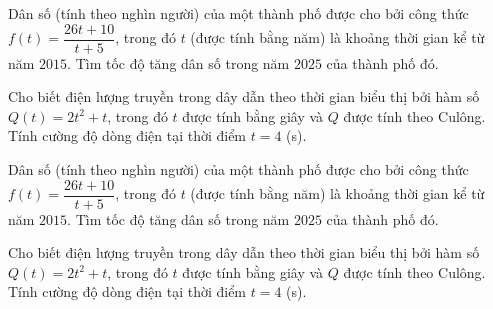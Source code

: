 \begin{bt}%
	Dân số (tính theo nghìn người) của một thành phố được cho bởi công thức $f(t)=\dfrac{26t+10}{t+5}$, trong đó $t$ (được tính bằng năm) là khoảng thời  gian kể từ năm $2015$. Tìm tốc độ tăng dân số trong năm $2025$ của thành phố đó.
\end{bt}

\begin{bt}%
	Cho biết điện lượng truyền trong dây dẫn theo thời gian biểu thị bởi hàm số $Q(t)=2t^2+t$, trong đó $t$ được tính bằng giây và $Q$ được tính theo Culông. Tính cường độ dòng điện tại thời  điểm $t=4$ (s).
\end{bt}

\begin{ex}%
	Dân số (tính theo nghìn người) của một thành phố được cho bởi công thức $f(t)=\dfrac{26t+10}{t+5}$, trong đó $t$ (được tính bằng năm) là khoảng thời gian kể từ năm $2015$. Tìm tốc độ tăng  dân số trong năm $2025$ của thành phố đó.
\end{ex}

\begin{ex}%
	 Cho biết điện lượng truyền trong dây dẫn theo thời gian biểu thị bởi hàm số $Q(t)=2t^2+t$, trong đó $t$ được tính bằng giây và $Q$ được tính theo Culông. Tính cường độ dòng điện tại thời điểm $t=4$ (s).
\end{ex}

